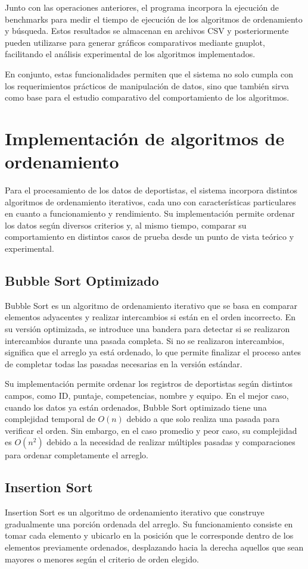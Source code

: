 Junto con las operaciones anteriores, el programa incorpora la ejecución de benchmarks para medir el tiempo de ejecución de los algoritmos de ordenamiento y búsqueda. Estos resultados se almacenan en archivos CSV y posteriormente pueden utilizarse para generar gráficos comparativos mediante gnuplot, facilitando el análisis experimental de los algoritmos implementados.

En conjunto, estas funcionalidades permiten que el sistema no solo cumpla con los requerimientos prácticos de manipulación de datos, sino que también sirva como base para el estudio comparativo del comportamiento de los algoritmos.
\section{Implementación de algoritmos de ordenamiento}
Para el procesamiento de los datos de deportistas, el sistema incorpora distintos algoritmos de ordenamiento iterativos, cada uno con características particulares en cuanto a funcionamiento y rendimiento. Su implementación permite ordenar los datos según diversos criterios y, al mismo tiempo, comparar su comportamiento en distintos casos de prueba desde un punto de vista teórico y experimental.


\subsection{Bubble Sort Optimizado}\label{subsec:bubblesort}
Bubble Sort es un algoritmo de ordenamiento iterativo que se basa en comparar elementos adyacentes y realizar intercambios si están en el orden incorrecto. En su versión optimizada, se introduce una bandera para detectar si se realizaron intercambios durante una pasada completa. Si no se realizaron intercambios, significa que el arreglo ya está ordenado, lo que permite finalizar el proceso antes de completar todas las pasadas necesarias en la versión estándar.

Su implementación permite ordenar los registros de deportistas según distintos campos, como ID, puntaje, competencias, nombre y equipo. En el mejor caso, cuando los datos ya están ordenados, Bubble Sort optimizado tiene una complejidad temporal de \(O(n)\) debido a que solo realiza una pasada para verificar el orden. Sin embargo, en el caso promedio y peor caso, su complejidad es \(O(n^2)\) debido a la necesidad de realizar múltiples pasadas y comparaciones para ordenar completamente el arreglo.

\subsection{Insertion Sort}
Insertion Sort es un algoritmo de ordenamiento iterativo que construye gradualmente una porción ordenada del arreglo. Su funcionamiento consiste en tomar cada elemento y ubicarlo en la posición que le corresponde dentro de los elementos previamente ordenados, desplazando hacia la derecha aquellos que sean mayores o menores según el criterio de orden elegido.

